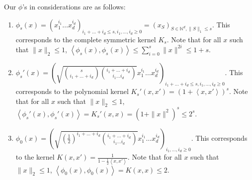 \documentclass{article}
\newcommand{\field}[1]{\mathbb{#1}}
\newcommand{\fN}{\field{N}}
\newcommand{\inner}[1]{ \left\langle {#1} \right\rangle }
\begin{document}
Our $\phi$'s in considerations are as follows:
\begin{enumerate}
\item $\phi_{s}(x) = ( x_1^{i_1} \ldots x_d^{i_d})_{i_1 + \ldots + i_d \leq s, i_1, \ldots, i_d \geq 0} = (x_S)_{S \in \fN^d, \|S\|_1 \leq s}$. This corresponds to the complete symmetric kernel $K_s$. Note that for all $x$ such that $\| x \|_2 \leq 1$,
$\inner{\phi_{s}(x), \phi_{s}(x)} \leq \sum_{i=0}^s \|x\|^{2i} \leq 1 + s$.

\item $\phi_{s}'(x) = ( \sqrt{ {s \choose i_1+\ldots+i_d} {i_1+\ldots+i_d \choose i_1 \ldots i_d}}  x_1^{i_1} \ldots x_d^{i_d})_{i_1 + \ldots + i_d \leq s, i_1, \ldots, i_d \geq 0}$. This corresponds to the polynomial kernel
$K_s'(x,x') = (1 + \inner{x, x'})^s$. Note that for all $x$ such that $\| x \|_2 \leq 1$,
$\inner{\phi_s'(x), \phi_s'(x)} = K_s'(x,x) = (1 + \|x\|^2)^s \leq 2^s$.

\item $\phi_0(x) = ( \sqrt{ (\frac 1 2)^{i_1+\ldots+i_d} {i_1+\ldots+i_d \choose i_1 \ldots i_d}}  x_1^{i_1} \ldots x_d^{i_d})_{i_1, \ldots, i_d \geq 0}$. This corresponds to the kernel $K(x,x') = \frac{1}{1 - \frac 1 2 \inner{x,x'}}$.
Note that for all $x$ such that $\| x \|_2 \leq 1$,
$\inner{\phi_0(x), \phi_0(x)} = K(x,x) \leq 2$.
\end{enumerate}
\end{document}
